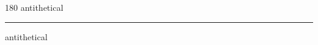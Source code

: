 
\begin{frame}
\begin{center}
\begin{turn}{180}
{\fontsize{2.5cm}{1em}\selectfont antithetical}
\end{turn}
\vspace{1em}\par  
\hrule
\vspace{1em}\par  
{\fontsize{2.5cm}{1em}\selectfont antithetical}
\end{center}
\end{frame}
